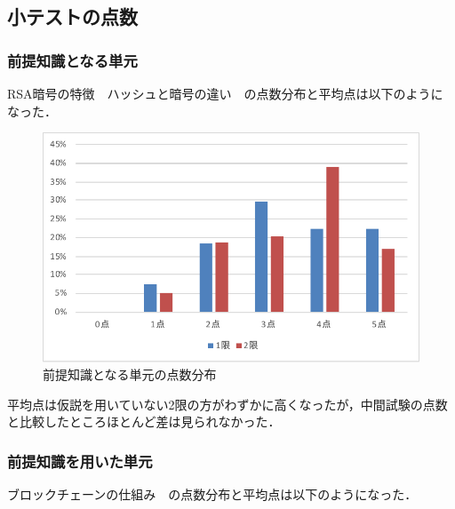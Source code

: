 \documentclass[a4j,12pt]{jsarticle}
\begin{document}
\newpage
\subsection{小テストの点数}
\subsubsection{前提知識となる単元}
RSA暗号の特徴　ハッシュと暗号の違い　の点数分布と平均点は以下のようになった．

\begin{figure}[H]
\centering
\includegraphics[width=12cm]{12test.pdf}
\caption{前提知識となる単元の点数分布}
\label{fig:no}
\end{figure} 

\begin{table}[H]
\centering
{}
\caption{前提知識となる単元の平均点の比較}
\label{fig:12ank}
\end{table}

平均点は仮説を用いていない2限の方がわずかに高くなったが，中間試験の点数と比較したところほとんど差は見られなかった．

\newpage
\subsubsection{前提知識を用いた単元}
ブロックチェーンの仕組み　の点数分布と平均点は以下のようになった．
\end{document}
